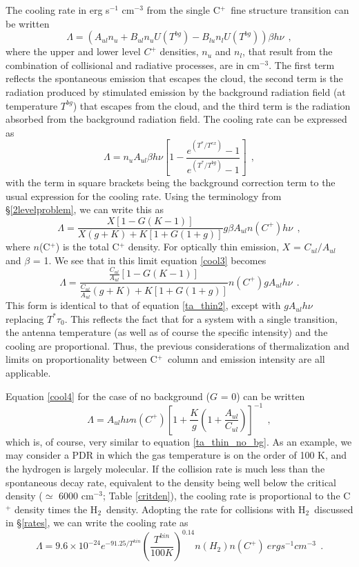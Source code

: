 \documentclass[12pt]{aastex}
\def \lp{\>\> .}
\def \lc{\>\> ,}
\def \hh{H$_2$}
\def \cp{C$^+$}
\def \be{\begin{equation}}
\def \ee{   \end{equation}}
\def \lc{\>\> ,}
\def \lp{\>\> .}
\begin{document}
The cooling rate in erg s$^{-1}$ cm$^{-3}$ from the single \cp\ fine structure transition can be written \citep{goldsmith1978}
\be
\Lambda = (A_{ul} n_u + B_{ul} n_u U(T^{bg}) - B_{lu} n_l U(T^{bg}))\beta h\nu \lc
\label{cool1}
\ee
where the upper and lower level $C^+$ densities, $n_u$ and $n_l$, that result from the combination of collisional and radiative processes, are in cm$^{-3}$.
The first term reflects the spontaneous emission that escapes the cloud, the second term is the radiation produced by stimulated emission by the background radiation field (at temperature $T^{bg}$) that escapes from the cloud, and the third term is the radiation absorbed from the background radiation field.
The cooling rate can be expressed as
\be
\Lambda = n_u A_{ul} \beta h \nu [1 - \frac{e^{(T^*/T^{ex})}  - 1}{e^{(T^*/T^{bg})} - 1}] \lc
\label{cool2}
\ee
with the term in square brackets being the background correction term to the usual expression for the cooling rate.
Using the terminology from \S \ref{2levelproblem}, we can write this as
\be
\Lambda = \frac{X[1 - G(K - 1)]}{X(g + K) + K[1 + G(1 + g)]} g \beta A_{ul} n(C^+) h \nu \lc
\label{cool3}
\ee
where $n$(C$^+$) is the total C$^+$ density.
For optically thin emission, $X$ = $C_{ul}/A_{ul}$ and $\beta$ = 1.  
We see that in this limit equation \ref{cool3} becomes
\be
\Lambda = \frac{\frac{C_{ul}}{A_{ul}}[1 - G(K - 1)]}{\frac{C_{ul}}{A_{ul}}(g + K) + K[1 + G(1 + g)]}n(C^+) g A_{ul} h \nu \lp
\label{cool4}
\ee
This form is identical to that of equation \ref{ta_thin2}, except with $g A_{ul} h \nu$ replacing $T^* \tau_0$.  This reflects the fact that for a system with a single transition, the antenna temperature (as well as of course the specific intensity) and the cooling are proportional.
Thus, the previous considerations of thermalization and limits on proportionality between \cp\ column and emission intensity are all applicable.

Equation \ref{cool4} for the case of no background ($G$ = 0) can be written
\be
\Lambda = A_{ul} h \nu n(C^+) [1 + \frac{K}{g} (1 + \frac{A_{ul}}{C_{ul}})]^{-1} \lc
\ee
which is, of course, very similar to equation \ref{ta_thin_no_bg}.  
As an example, we may consider a PDR in which the gas temperature is on the order of 100 K, and the hydrogen is largely molecular.
If the collision rate is much less than the spontaneous decay rate, equivalent to the density being well below the critical density ($\simeq$ 6000 cm$^{-3}$; Table \ref{critden}), the cooling rate is proportional to the C$^+$ density times the \hh\ density.
Adopting the rate for collisions with \hh\ discussed in \S\ref{rates}, we can write the cooling rate as
\be
\Lambda = 9.6\times10^{-24}e^{-91.25/T^{kin}}(\frac{T^{kin}}{100 K})^{0.14} n(H_2)n(C^+) ~erg s^{-1} cm^{-3} \lp
\ee
\end{document}
